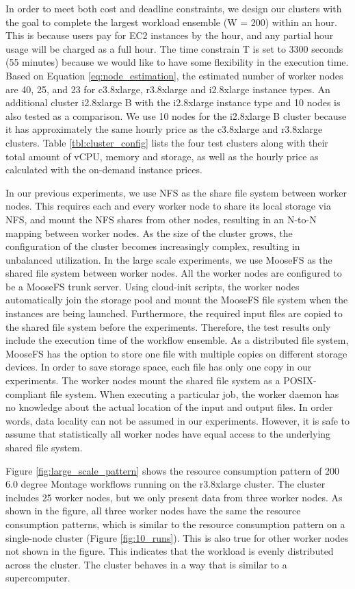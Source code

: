 In order to meet both cost and deadline constraints, we design our clusters with the goal to complete the largest workload ensemble (W = 200) within an hour. This is because users pay for EC2 instances by the hour, and any partial hour usage will be charged as a full hour. The time constrain T is set to 3300 seconds (55 minutes) because we would like to have some flexibility in the execution time. Based on Equation \ref{eq:node_estimation}, the estimated number of worker nodes are 40, 25, and 23 for c3.8xlarge, r3.8xlarge and i2.8xlarge instance types. An additional cluster i2.8xlarge B with the i2.8xlarge instance type and 10 nodes is also tested as a comparison. We use 10 nodes for the i2.8xlarge B cluster because it has approximately the same hourly price as the c3.8xlarge and r3.8xlarge clusters. Table \ref{tbl:cluster_config} lists the four test clusters along with their total amount of vCPU, memory and storage, as well as the hourly price as calculated with the on-demand instance prices. 

In our previous experiments, we use NFS as the share file system between worker nodes. This requires each and every worker node to share its local storage via NFS, and mount the NFS shares from other nodes, resulting in an N-to-N mapping between worker nodes. As the size of the cluster grows, the configuration of the cluster becomes increasingly complex, resulting in unbalanced utilization. In the large scale experiments, we use MooseFS \cite{moosefs} as the shared file system between worker nodes. All the worker nodes are configured to be a MooseFS trunk server. Using cloud-init scripts, the worker nodes automatically join the storage pool and mount the MooseFS file system when the instances are being launched. Furthermore, the required input files are copied to the shared file system before the experiments. Therefore, the test results only include the execution time of the workflow ensemble. As a distributed file system, MooseFS has the option to store one file with multiple copies on different storage devices. In order to save storage space, each file has only one copy in our experiments. The worker nodes mount the shared file system as a POSIX-compliant file system. When executing a particular job, the worker daemon has no knowledge about the actual location of the input and output files. In order words, data locality can not be assumed in our experiments. However, it is safe to assume that statistically all worker nodes have equal access to the underlying shared file system. 


Figure \ref{fig:large_scale_pattern} shows the resource consumption pattern of 200 6.0 degree Montage workflows running on the r3.8xlarge cluster. The cluster includes 25 worker nodes, but we only present data from three worker nodes. As shown in the figure, all three worker nodes have the same the resource consumption patterns, which is similar to the resource consumption pattern on a single-node cluster (Figure \ref{fig:10_runs}). This is also true for other worker nodes not shown in the figure. This indicates that the workload is evenly distributed across the cluster. The cluster behaves in a way that is similar to a supercomputer. 


